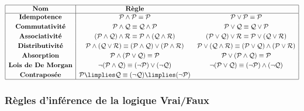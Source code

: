 \documentclass[11pt,class=report,crop=false]{standalone}
\begin{document}
\[
\begin{array}{| c | c c|}
    \hline
    \textbf{Nom} & \textbf{Règle} & \\
    \hline
	\textbf{Idempotence} 
	& \mathcal{P}\land\mathcal{P} \equiv \mathcal{P}
	& \mathcal{P}\lor\mathcal{P} \equiv \mathcal{P}
	\\[0.6ex]
	
	\textbf{Commutativité}
	& \mathcal{P}\land\mathcal{Q} \equiv \mathcal{Q}\land\mathcal{P}
	& \mathcal{P}\lor\mathcal{Q} \equiv \mathcal{Q}\lor\mathcal{P}
	\\[0.6ex]
	
	\textbf{Associativité}
	& (\mathcal{P}\land\mathcal{Q})\land\mathcal{R} \equiv \mathcal{P}\land(\mathcal{Q}\land\mathcal{R})
	& (\mathcal{P}\lor\mathcal{Q})\lor\mathcal{R} \equiv \mathcal{P}\lor(\mathcal{Q}\lor\mathcal{R})
	\\[0.6ex]
	
	\textbf{Distributivité}
	& \mathcal{P}\land(\mathcal{Q}\lor\mathcal{R}) \equiv (\mathcal{P}\land\mathcal{Q}) \lor (\mathcal{P}\land\mathcal{R})
	& \mathcal{P}\lor(\mathcal{Q}\land\mathcal{R}) \equiv (\mathcal{P}\lor\mathcal{Q}) \land (\mathcal{P}\lor\mathcal{R})
	\\[0.6ex]
	
	\textbf{Absorption}
	& \mathcal{P}\land(\mathcal{P}\lor\mathcal{Q}) \equiv \mathcal{P}
	& \mathcal{P}\lor(\mathcal{P}\land\mathcal{Q}) \equiv \mathcal{P}
	\\[0.6ex]
	
	\textbf{Lois de De Morgan}
	& \lnot(\mathcal{P}\land\mathcal{Q}) \equiv (\lnot\mathcal{P})\lor(\lnot\mathcal{Q})
	& \lnot(\mathcal{P}\lor\mathcal{Q}) \equiv (\lnot\mathcal{P})\land(\lnot\mathcal{Q})
	\\[0.6ex]
	
	\textbf{Contraposée}
	& \mathcal{P}\limplies\mathcal{Q} \equiv (\lnot\mathcal{Q})\limplies(\lnot\mathcal{P})
	& \\
    \hline
\end{array}
\]

\subsubsection{Règles d'inférence de la logique Vrai/Faux}
\end{document}
